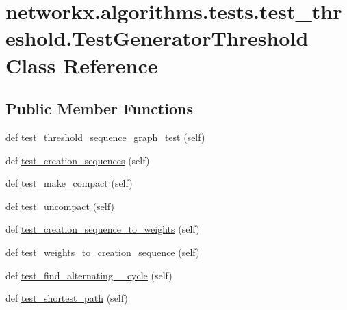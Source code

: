 \hypertarget{classnetworkx_1_1algorithms_1_1tests_1_1test__threshold_1_1TestGeneratorThreshold}{}\section{networkx.\+algorithms.\+tests.\+test\+\_\+threshold.\+Test\+Generator\+Threshold Class Reference}
\label{classnetworkx_1_1algorithms_1_1tests_1_1test__threshold_1_1TestGeneratorThreshold}
\subsection*{Public Member Functions}
\begin{DoxyCompactItemize}
\item 
def \hyperlink{classnetworkx_1_1algorithms_1_1tests_1_1test__threshold_1_1TestGeneratorThreshold_adf51ed4867be16c13d8d94ae31ca7237}{test\+\_\+threshold\+\_\+sequence\+\_\+graph\+\_\+test} (self)
\item 
def \hyperlink{classnetworkx_1_1algorithms_1_1tests_1_1test__threshold_1_1TestGeneratorThreshold_a961f9541f71cdafbe43461a729d357c9}{test\+\_\+creation\+\_\+sequences} (self)
\item 
def \hyperlink{classnetworkx_1_1algorithms_1_1tests_1_1test__threshold_1_1TestGeneratorThreshold_acf0e6a4d67b7a9cf8ac9593d5f7b6c63}{test\+\_\+make\+\_\+compact} (self)
\item 
def \hyperlink{classnetworkx_1_1algorithms_1_1tests_1_1test__threshold_1_1TestGeneratorThreshold_aa5cf3249efe0847a171058f13bd1c3d6}{test\+\_\+uncompact} (self)
\item 
def \hyperlink{classnetworkx_1_1algorithms_1_1tests_1_1test__threshold_1_1TestGeneratorThreshold_ab7674e1ef858cbdb739262eb6efa72a5}{test\+\_\+creation\+\_\+sequence\+\_\+to\+\_\+weights} (self)
\item 
def \hyperlink{classnetworkx_1_1algorithms_1_1tests_1_1test__threshold_1_1TestGeneratorThreshold_a432e1e107e2c9434da2e9f82c92c0d59}{test\+\_\+weights\+\_\+to\+\_\+creation\+\_\+sequence} (self)
\item 
def \hyperlink{classnetworkx_1_1algorithms_1_1tests_1_1test__threshold_1_1TestGeneratorThreshold_a42fdd99c4e01c750784ff0a1c30f31bb}{test\+\_\+find\+\_\+alternating\+\_\+\_\+cycle} (self)
\item 
def \hyperlink{classnetworkx_1_1algorithms_1_1tests_1_1test__threshold_1_1TestGeneratorThreshold_a7700c27074b188ceff2918079a2247e4}{test\+\_\+shortest\+\_\+path} (self)

\end{DoxyCompactItemize}
